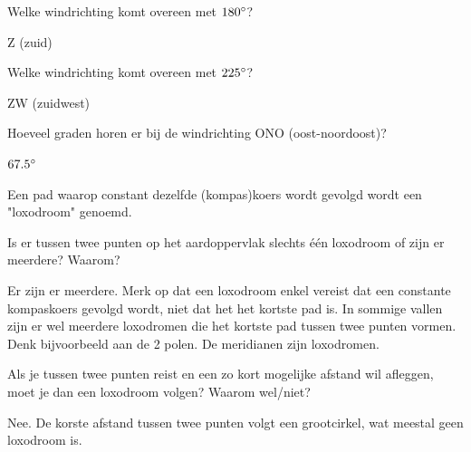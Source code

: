 \begin{opgave}
	\begin{subopgave}
		Welke windrichting komt overeen met $180\degree$?
		\begin{antwoord}
			Z (zuid)
		\end{antwoord}
	\end{subopgave}
	\begin{subopgave}
		Welke windrichting komt overeen met $225\degree$?
		\begin{antwoord}
			ZW (zuidwest)
		\end{antwoord}
	\end{subopgave}
	\begin{subopgave}
		Hoeveel graden horen er bij de windrichting ONO (oost-noordoost)?
		\begin{antwoord}
			$67.5\degree$
		\end{antwoord}
	\end{subopgave}
\end{opgave}

Een pad waarop constant dezelfde (kompas)koers wordt gevolgd wordt een "loxodroom" genoemd.

\begin{opgave}
	\begin{subopgave}
		Is er tussen twee punten op het aardoppervlak slechts \'e\'en loxodroom of  zijn er meerdere? Waarom?
		\begin{antwoord}
			Er zijn er meerdere. Merk op dat een loxodroom enkel vereist dat een constante kompaskoers gevolgd wordt, niet dat het het kortste pad is. In sommige vallen zijn er wel meerdere loxodromen die het kortste pad tussen twee punten vormen. Denk bijvoorbeeld aan de 2 polen. De meridianen zijn loxodromen.
		\end{antwoord}
	\end{subopgave}
	\begin{subopgave}
		Als je tussen twee punten reist en een zo kort mogelijke afstand wil afleggen, moet je dan een loxodroom volgen? Waarom wel/niet?
		\begin{antwoord}
			Nee. De korste afstand tussen twee punten volgt een grootcirkel, wat meestal geen loxodroom is.
		\end{antwoord}
	\end{subopgave}
\end{opgave}

